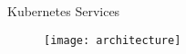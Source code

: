 \begin{frame}{Kubernetes Services}
  \begin{figure}
    \centering
    \texttt{[image: architecture]}
  \end{figure}
\end{frame}
